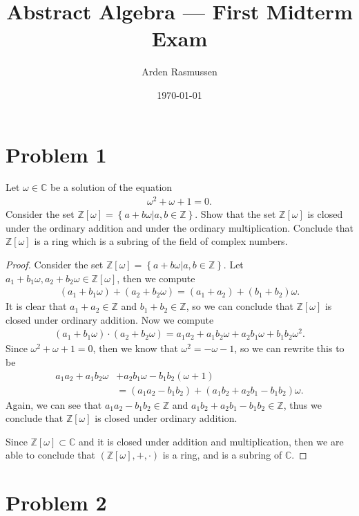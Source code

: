\documentclass[10pt]{armath}
\title{Abstract Algebra --- First Midterm Exam}
\author{Arden Rasmussen}
\date{\today}
\newcommand{\Z}{\mathbb{Z}}
\newcommand{\C}{\mathbb{C}}
\newcommand{\zw}{\mathbb{Z}\left[\omega\right]}
\begin{document}
\maketitle

\section*{Problem 1}%
\label{sec:problem_1}

Let $\omega\in\C$ be a solution of the equation
\begin{align*}
   \omega^2+\omega+1=0.
\end{align*}
Consider the set $\zw=\left\{a+b\omega\vert a,b\in\Z \right\}$. Show that the
set $\zw$ is closed under the ordinary addition and under the ordinary
multiplication. Conclude that $\zw$ is a ring which is a subring of the field of
complex numbers.

\begin{proof}
  Consider the set $\zw=\left\{a+b\omega\vert a,b\in\Z \right\}$. Let
  $a_1+b_1\omega,a_2+b_2\omega\in\zw$, then we compute
  \begin{align*}
    \left(a_1+b_1\omega\right)+\left(a_2+b_2\omega\right)=(a_1+a_2)+(b_1+b_2)\omega.
  \end{align*}
  It is clear that $a_1+a_2\in\Z$ and $b_1+b_2\in\Z$, so we can conclude that
  $\zw$ is closed under ordinary addition. Now we compute
  \begin{align*}
    \left(a_1+b_1\omega\right)\cdot\left(a_2+b_2\omega\right)=a_1a_2+a_1b_2\omega+a_2b_1\omega+b_1b_2\omega^2.
  \end{align*}
  Since $\omega^2+\omega+1=0$, then we know that $\omega^2=-\omega-1$, so we
  can rewrite this to be
  \begin{align*}
    a_1a_2+a_1b_2\omega&+a_2b_1\omega-b_1b_2(\omega+1)\\
                       &=
                       \left(a_1a_2-b_1b_2\right)+\left(a_1b_2+a_2b_1-b_1b_2\right)\omega.
  \end{align*}
  Again, we can see that $a_1a_2-b_1b_2\in\Z$ and $a_1b_2+a_2b_1-b_1b_2\in\Z$,
  thus we conclude that $\zw$ is closed under ordinary addition.

  Since $\zw\subset \C$ and it is closed under addition and multiplication,
  then we are able to conclude that $\left(\zw,+,\cdot\right)$ is a ring, and
  is a subring of $\C$.
\end{proof}

\section*{Problem 2}%
\label{sec:problem_2}
\end{document}
